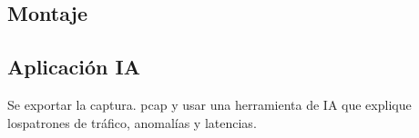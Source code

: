 \subsection{Montaje}


\subsection{Aplicación IA}
Se exportar la captura. pcap y usar una herramienta de IA que explique lospatrones de tráfico, anomalías y latencias.

